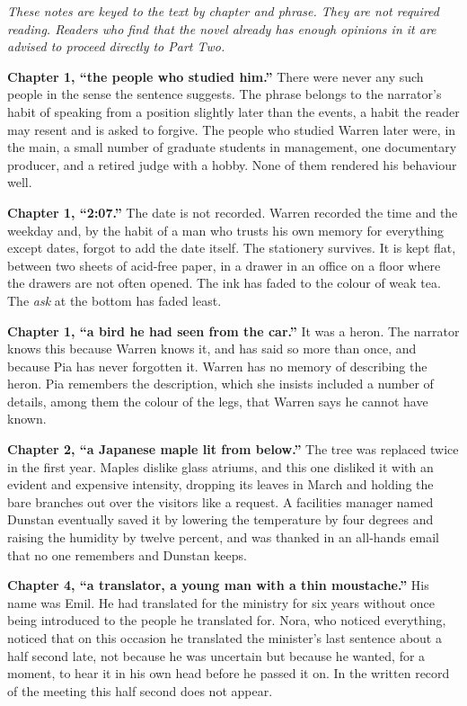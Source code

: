 {\small

\emph{These notes are keyed to the text by chapter and phrase. They are not required reading. Readers who find that the novel already has enough opinions in it are advised to proceed directly to Part Two.}

\textbf{Chapter 1, ``the people who studied him.''} There were never any such people in the sense the sentence suggests. The phrase belongs to the narrator's habit of speaking from a position slightly later than the events, a habit the reader may resent and is asked to forgive. The people who studied Warren later were, in the main, a small number of graduate students in management, one documentary producer, and a retired judge with a hobby. None of them rendered his behaviour well.

\textbf{Chapter 1, ``2:07.''} The date is not recorded. Warren recorded the time and the weekday and, by the habit of a man who trusts his own memory for everything except dates, forgot to add the date itself. The stationery survives. It is kept flat, between two sheets of acid-free paper, in a drawer in an office on a floor where the drawers are not often opened. The ink has faded to the colour of weak tea. The \emph{ask} at the bottom has faded least.

\textbf{Chapter 1, ``a bird he had seen from the car.''} It was a heron. The narrator knows this because Warren knows it, and has said so more than once, and because Pia has never forgotten it. Warren has no memory of describing the heron. Pia remembers the description, which she insists included a number of details, among them the colour of the legs, that Warren says he cannot have known.

\textbf{Chapter 2, ``a Japanese maple lit from below.''} The tree was replaced twice in the first year. Maples dislike glass atriums, and this one disliked it with an evident and expensive intensity, dropping its leaves in March and holding the bare branches out over the visitors like a request. A facilities manager named Dunstan eventually saved it by lowering the temperature by four degrees and raising the humidity by twelve percent, and was thanked in an all-hands email that no one remembers and Dunstan keeps.

\textbf{Chapter 4, ``a translator, a young man with a thin moustache.''} His name was Emil. He had translated for the ministry for six years without once being introduced to the people he translated for. Nora, who noticed everything, noticed that on this occasion he translated the minister's last sentence about a half second late, not because he was uncertain but because he wanted, for a moment, to hear it in his own head before he passed it on. In the written record of the meeting this half second does not appear.

}
